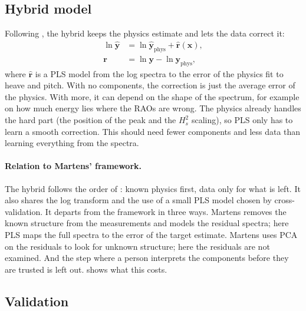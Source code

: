 \documentclass[10pt,a4paper,twocolumn,twoside]{article}
\newcommand{\Hs}{H_{s}}
\newcommand{\vect}[1]{\boldsymbol{#1}}
\begin{document}
\subsection{Hybrid model}
\label{sec:theory_hybrid}

Following \citet{martens2023}, the hybrid keeps the physics estimate and lets the data correct it:
\begin{equation}
\begin{split}
\ln \hat{\vect y} &= \ln \hat{\vect y}_{\text{phys}} + \hat{\vect r}(\vect x),
\\
\vect r &= \ln\vect y - \ln\vect y_{\text{phys}},
\end{split}
\label{eq:hybrid}
\end{equation}
where $\hat{\vect r}$ is a PLS model from the log spectra to the error of the physics fit to heave
and pitch. With no components, the correction is just the average error of the physics. With more,
it can depend on the shape of the spectrum, for example on how much energy lies where the RAOs are
wrong. The physics already handles the hard part (the position of the peak and the $\Hs^2$
scaling), so PLS only has to learn a smooth correction. This should need fewer components and less
data than learning everything from the spectra.

\paragraph{Relation to Martens' framework.}
The hybrid follows the order of \citet{martens2023}: known physics first, data only for what is
left. It also shares the log transform and the use of a small PLS model chosen by
cross-validation. It departs from the framework in three ways. Martens removes the known structure
from the measurements and models the residual spectra; here PLS maps the full spectra to the error
of the target estimate. Martens uses PCA on the residuals to look for unknown structure; here the
residuals are not examined. And the step where a person interprets the components before they are
trusted is left out.  shows what this costs.

\subsection{Validation}
\label{sec:theory_validation}
\end{document}
